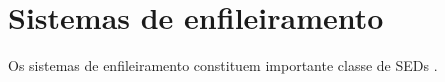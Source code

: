 \chapter{Sistemas de enfileiramento}

Os sistemas de enfileiramento constituem importante classe de \acs{SED}s \cite{cassandras}.
